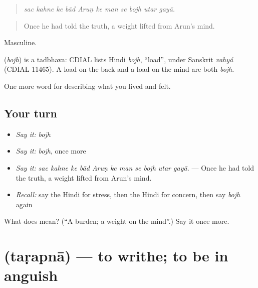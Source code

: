 \begin{quote}
          
\end{quote}

\begin{quote}
\emph{sac kahne ke bād Aruṇ ke man se bojh utar gayā.}
\end{quote}

\begin{quote}
Once he had told the truth, a weight lifted from Arun's mind.
\end{quote}

Masculine.

\begin{cousinweb}
\textbf{} (\emph{bojh}) is a tadbhava: CDIAL lists Hindi \emph{bojh}, \textquotedblleft{}load\textquotedblright{}, under Sanskrit \emph{vahyá} (CDIAL 11465). A load on the back and a load on the mind are both \emph{bojh}.
\end{cousinweb}

\begin{grammarlens}[title={What you've built}]
One more word for describing what you lived and felt.
\end{grammarlens}

\subsection*{Your turn}
\begin{itemize}
\raggedright
  \item \emph{Say it:} \emph{bojh}
  \item \emph{Say it:} \emph{bojh}, once more
  \item \emph{Say it:} \emph{sac kahne ke bād Aruṇ ke man se bojh utar gayā.} — Once he had told the truth, a weight lifted from Arun's mind.
  \item \emph{Recall:} say the Hindi for stress, then the Hindi for concern, then say \emph{bojh} again
\end{itemize}

\begin{tcolorbox}[breakable,colback=teal!4,colframe=teal!35!black,title={Before you move on}]
What does  mean? (\textquotedblleft{}A burden; a weight on the mind\textquotedblright{}.) Say it once more.
\end{tcolorbox}
\section[\texorpdfstring{\hi{तड़पना} (taṛapnā)}{तड़पना (taṛapnā)}]{ (taṛapnā) — to writhe; to be in anguish}

